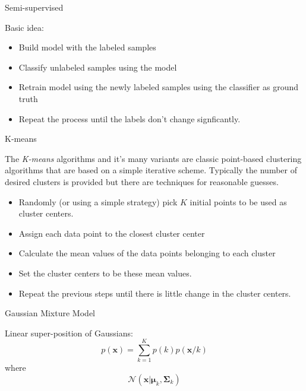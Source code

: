 \documentclass[12pt]{beamer}
\begin{document}
\begin{frame}{Semi-supervised} 

Basic idea: 

\begin{itemize} 
\item Build model with the labeled samples 
\item Classify unlabeled samples using the model 
\item Retrain model using the newly labeled samples using 
the classifier as ground truth 
\item Repeat the process until the labels don't change signficantly. 
\end{itemize} 

\end{frame}










\begin{frame}{K-means} 

The {\it K-means} algorithms and it's many variants are classic
point-based clustering algorithms that are based on a simple iterative
scheme. Typically the number of desired clusters is provided but there
are techniques for reasonable guesses.

\begin{itemize} 
\item Randomly (or using a simple strategy) pick $K$ initial points to
  be used as cluster centers.
\item Assign each data point to the closest cluster center 
\item Calculate the mean values of the data points belonging to each cluster 
\item Set the cluster centers to be these mean values. 
\item Repeat the previous steps until there is little change in the cluster centers. 
\end{itemize} 


\end{frame} 



\begin{frame}{Gaussian Mixture Model} 

Linear super-position of Gaussians: 
\[
p({\boldsymbol x}) = \sum_{k=1}^{K} p(k)p({\boldsymbol x}/k) 
\] 
\noindent 
where 
\[
\mathcal{N}({\boldsymbol x}| {\boldsymbol \mu}_k, {\boldsymbol \Sigma}_k)
\]
\end{frame} 
\end{document}
